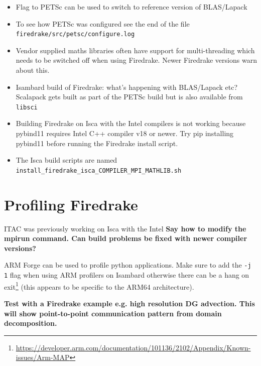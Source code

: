 \documentclass[a4paper,titlepage]{article}
\begin{document}
\begin{itemize}
\item Flag to PETSc can be used to switch to reference version of BLAS/Lapack
\item To see how PETSc was configured see the end of the file \texttt{firedrake/src/petsc/configure.log}

\item Vendor supplied maths libraries often have support for multi-threading which needs to be switched off when using Firedrake. Newer Firedrake versions warn about this.

\item Isambard build of Firedrake: what's happening with BLAS/Lapack etc? Scalapack gets built as part of the PETSc build but is also available from \texttt{libsci}
\item Building Firedrake on Isca with the Intel compilers is not working because pybind11 requires Intel C++ compiler v18 or newer. Try pip installing pybind11 before running the Firedrake install script.
\item The Isca build scripts are named \verb+install_firedrake_isca_COMPILER_MPI_MATHLIB.sh+
\end{itemize}


\section{Profiling Firedrake}
\label{section:profiling_firedrake}

ITAC was previously working on Isca with the Intel \textbf{Say how to modify the mpirun command. Can build problems be fixed with newer compiler versions?}

ARM Forge can be used to profile python applications. Make sure to add the \verb+-j 1+ flag when using ARM profilers on Isambard otherwise there can be a hang on exit\footnote{\url{https://developer.arm.com/documentation/101136/2102/Appendix/Known-issues/Arm-MAP}} (this appears to be specific to the ARM64 architecture).

\textbf{Test with a Firedrake example e.g. high resolution DG advection. This will show point-to-point communication pattern from domain decomposition.}

\end{document}

